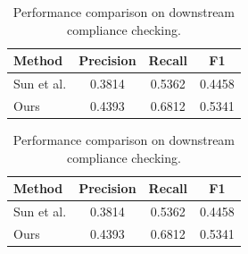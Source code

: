 \begin{table}[t]
\centering
\caption{Performance comparison on downstream compliance checking.}
\label{tab:stage3}
\begin{tabular}{lccc}
\hline
Method & Precision & Recall & F1 \\
\hline
Sun et al. & 0.3814 & 0.5362 & 0.4458 \\
Ours        & 0.4393 & 0.6812 & 0.5341 \\
\hline
\end{tabular}
\end{table}

\begin{table}[t]
\centering
\caption{Performance comparison on downstream compliance checking.}
\label{tab:stage3}
\begin{tabular}{lccc}
\toprule
Method & Precision & Recall & F1 \\
\midrule
Sun et al. & 0.3814 & 0.5362 & 0.4458 \\
Ours        & 0.4393 & 0.6812 & 0.5341 \\
\bottomrule
\end{tabular}
\end{table}
